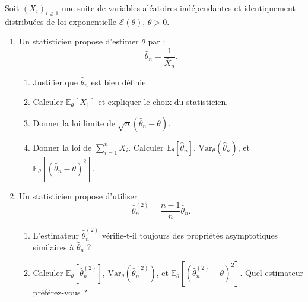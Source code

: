 \begin{mdframed}
\begin{exercice}
Soit $(X_i)_{i \ge 1}$ une suite de variables aléatoires indépendantes et identiquement distribuées de loi exponentielle $\mathcal{E}(\theta)$, $\theta > 0$.

\begin{enumerate}
    \item Un statisticien propose d'estimer $\theta$ par :
    \begin{equation*}
    \hat{\theta}_n = \frac{1}{\bar{X}_n}.
    \end{equation*}
    \begin{enumerate}
        \item[i--] Justifier que $\hat{\theta}_n$ est bien définie.
        \item[ii--] Calculer $\mathbb{E}_\theta[X_1]$ et expliquer le choix du statisticien.
        \item[iii--] Donner la loi limite de $\sqrt{n}(\hat{\theta}_n - \theta)$.
        \item[iv--] Donner la loi de $\sum_{i=1}^n X_i$. Calculer $\mathbb{E}_\theta[\hat{\theta}_n]$, $\text{Var}_\theta(\hat{\theta}_n)$, et $\mathbb{E}_\theta[(\hat{\theta}_n - \theta)^2]$.
    \end{enumerate}
    
    \item Un statisticien propose d'utiliser
    \begin{equation*}
    \hat{\theta}_n^{(2)} = \frac{n-1}{n} \hat{\theta}_n.
    \end{equation*}
    \begin{enumerate}
        \item[i--] L'estimateur $\hat{\theta}_n^{(2)}$ vérifie-t-il toujours des propriétés asymptotiques similaires à $\hat{\theta}_n$ ?
        \item[ii--] Calculer $\mathbb{E}_\theta[\hat{\theta}_n^{(2)}]$, $\text{Var}_\theta(\hat{\theta}_n^{(2)})$, et $\mathbb{E}_\theta[(\hat{\theta}_n^{(2)} - \theta)^2]$. Quel estimateur préférez-vous ?
    \end{enumerate}
\end{enumerate}
\end{exercice}
\end{mdframed}

\smallskip

